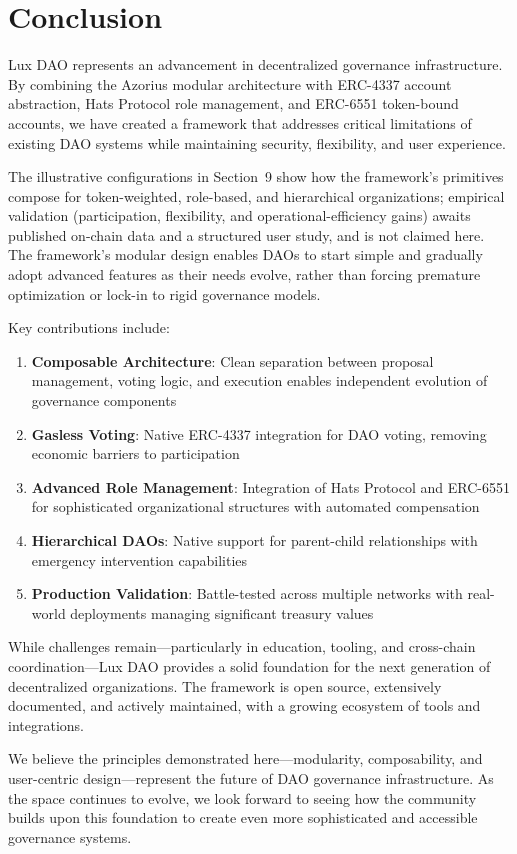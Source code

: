\section{Conclusion}


Lux DAO represents an advancement in decentralized governance infrastructure. By combining the Azorius modular architecture with ERC-4337 account abstraction, Hats Protocol role management, and ERC-6551 token-bound accounts, we have created a framework that addresses critical limitations of existing DAO systems while maintaining security, flexibility, and user experience.

The illustrative configurations in Section~9 show how the framework's primitives compose for token-weighted, role-based, and hierarchical organizations; empirical validation (participation, flexibility, and operational-efficiency gains) awaits published on-chain data and a structured user study, and is not claimed here. The framework's modular design enables DAOs to start simple and gradually adopt advanced features as their needs evolve, rather than forcing premature optimization or lock-in to rigid governance models.

Key contributions include:

\begin{enumerate}
    \item \textbf{Composable Architecture}: Clean separation between proposal management, voting logic, and execution enables independent evolution of governance components
    \item \textbf{Gasless Voting}: Native ERC-4337 integration for DAO voting, removing economic barriers to participation
    \item \textbf{Advanced Role Management}: Integration of Hats Protocol and ERC-6551 for sophisticated organizational structures with automated compensation
    \item \textbf{Hierarchical DAOs}: Native support for parent-child relationships with emergency intervention capabilities
    \item \textbf{Production Validation}: Battle-tested across multiple networks with real-world deployments managing significant treasury values
\end{enumerate}

While challenges remain---particularly in education, tooling, and cross-chain coordination---Lux DAO provides a solid foundation for the next generation of decentralized organizations. The framework is open source, extensively documented, and actively maintained, with a growing ecosystem of tools and integrations.

We believe the principles demonstrated here---modularity, composability, and user-centric design---represent the future of DAO governance infrastructure. As the space continues to evolve, we look forward to seeing how the community builds upon this foundation to create even more sophisticated and accessible governance systems.

